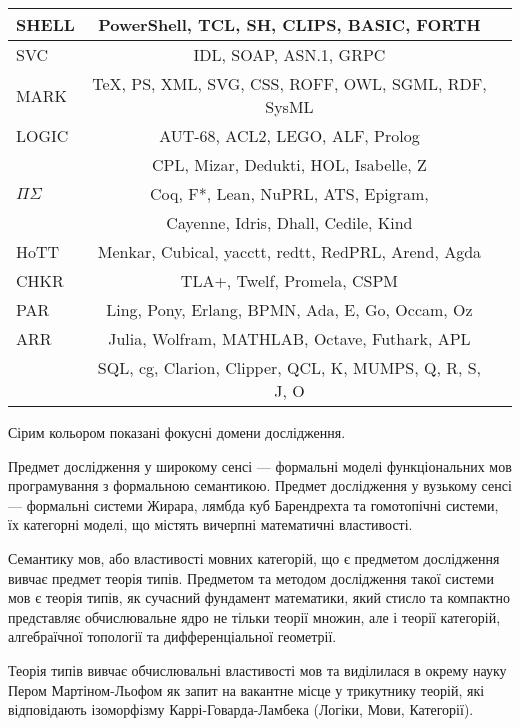 \begin{table}
\begin{tabular}{lcc}
    \hline
       SHELL & PowerShell, TCL, SH, CLIPS, BASIC, FORTH \\
    \hline
       SVC & IDL, SOAP, ASN.1, GRPC \\
    \hline
       MARK & TeX, PS, XML, SVG, CSS, ROFF, OWL, SGML, RDF, SysML \\
    \hline
       LOGIC & AUT-68, ACL2, LEGO, ALF, Prolog \\
             & CPL, Mizar, Dedukti, HOL, Isabelle, Z \\
    \hline
\rowcolor{LightGray}
       $\Pi\Sigma$ & Coq, F*, Lean, NuPRL, ATS, Epigram, \\
\rowcolor{LightGray}
          & Cayenne, Idris, Dhall, Cedile, Kind \\
    \hline
\rowcolor{LightGray}
       HoTT & Menkar, Cubical, yacctt, redtt, RedPRL, Arend, Agda \\
    \hline
\rowcolor{LightGray25}
       CHKR & TLA+, Twelf, Promela, CSPM \\
    \hline
\rowcolor{LightGray}
       PAR & Ling, Pony, Erlang, BPMN, Ada, E, Go, Occam, Oz \\
    \hline
\rowcolor{LightGray}
       ARR & Julia, Wolfram, MATHLAB, Octave, Futhark, APL \\
\rowcolor{LightGray}
           & SQL, cg, Clarion, Clipper, QCL, K, MUMPS, Q, R, S, J, O \\
    \hline
  \end{tabular}
\small Сірим кольором показані фокусні домени дослідження.
\end{table}

Предмет дослідження у широкому сенсі --- формальні моделі функціональних
мов програмування з формальною семантикою. Предмет дослідження у
вузькому сенсі --- формальні системи Жирара, лямбда куб Барендрехта
та гомотопічні системи, їх категорні моделі, що містять вичерпні
математичні властивості.

Семантику мов, або властивості мовних категорій, що є предметом
дослідження вивчає предмет теорія типів. Предметом та методом
дослідження такої системи мов є теорія типів, як сучасний фундамент
математики, який стисло та компактно представляє обчислювальне ядро
не тільки теорії множин, але і теорії категорій, алгебраїчної
топології та дифференціальної геометрії.

Теорія типів вивчає обчислювальні властивості мов та виділилася
в окрему науку Пером Мартіном-Льофом як запит на вакантне місце
у трикутнику теорій, які відповідають ізоморфізму
Каррі-Говарда-Ламбека (Логіки, Мови, Категорії).

